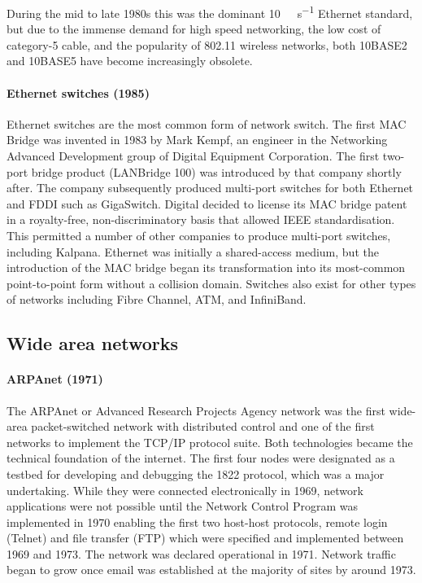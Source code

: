 {During the mid to late 1980s this was the dominant \SI{10}{\mega\bit\per\second} Ethernet standard, but due to the immense demand for high speed networking, the low cost of category-5 cable, and the popularity of 802.11 wireless networks, both 10BASE2 and 10BASE5 have become increasingly obsolete.

\paragraph{Ethernet switches (1985)}
Ethernet switches are the most common form of network switch.
The first MAC Bridge was invented in 1983 by Mark Kempf, an engineer in the Networking Advanced Development group of Digital Equipment Corporation.
The first two-port bridge product (LANBridge 100) was introduced by that company shortly after.
The company subsequently produced multi-port switches for both Ethernet and FDDI such as GigaSwitch.
Digital decided to license its MAC bridge patent in a royalty-free, non-dis\-crim\-i\-na\-tory basis that allowed IEEE standardisation.
This permitted a number of other companies to produce multi-port switches, including Kalpana.
Ethernet was initially a shared-access medium, but the introduction of the MAC bridge began its transformation into its most-common point-to-point form without a collision domain.
Switches also exist for other types of networks including Fibre Channel, ATM, and InfiniBand.
    
\subsection{Wide area networks}
\label{sec:network-evoluation-wan}

\paragraph{ARPAnet (1971)}
The ARPAnet or Advanced Research Projects Agency network was the first wide-area packet-switched network with distributed control and one of the first networks to implement the TCP/IP protocol suite.
Both technologies became the technical foundation of the internet.
The first four nodes were designated as a testbed for developing and debugging the 1822 protocol, which was a major undertaking.
While they were connected electronically in 1969, network applications were not possible until the Network Control Program was implemented in 1970 enabling the first two host-host protocols, remote login (Telnet) and file transfer (FTP) which were specified and implemented between 1969 and 1973.
The network was declared operational in 1971.
Network traffic began to grow once email was established at the majority of sites by around 1973.

}
